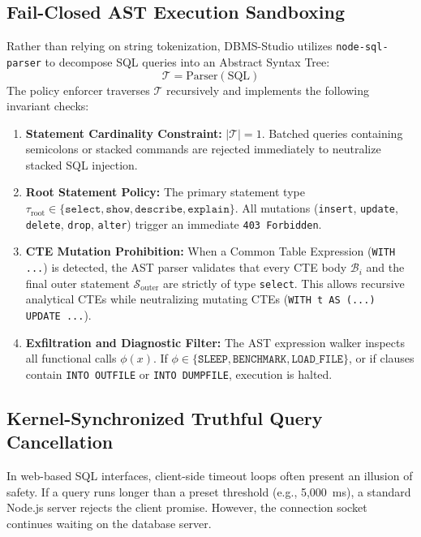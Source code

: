 \documentclass[conference]{IEEEtran}
\begin{document}
\subsection{Fail-Closed AST Execution Sandboxing}
Rather than relying on string tokenization, DBMS-Studio utilizes \texttt{node-sql-parser} to decompose SQL queries into an Abstract Syntax Tree:
\begin{equation}
    \mathcal{T} = \text{Parser}(\text{SQL})
\end{equation}
The policy enforcer traverses $\mathcal{T}$ recursively and implements the following invariant checks:
\begin{enumerate}
    \item \textbf{Statement Cardinality Constraint:} $|\mathcal{T}| = 1$. Batched queries containing semicolons or stacked commands are rejected immediately to neutralize stacked SQL injection.
    \item \textbf{Root Statement Policy:} The primary statement type $\tau_{\text{root}} \in \{\texttt{select}, \texttt{show}, \texttt{describe}, \texttt{explain}\}$. All mutations (\texttt{insert}, \texttt{update}, \texttt{delete}, \texttt{drop}, \texttt{alter}) trigger an immediate \texttt{403 Forbidden}.
    \item \textbf{CTE Mutation Prohibition:} When a Common Table Expression (\texttt{WITH ...}) is detected, the AST parser validates that every CTE body $\mathcal{B}_i$ and the final outer statement $\mathcal{S}_{\text{outer}}$ are strictly of type \texttt{select}. This allows recursive analytical CTEs while neutralizing mutating CTEs (\texttt{WITH t AS (...) UPDATE ...}).
    \item \textbf{Exfiltration and Diagnostic Filter:} The AST expression walker inspects all functional calls $\phi(x)$. If $\phi \in \{\texttt{SLEEP}, \texttt{BENCHMARK}, \texttt{LOAD\_FILE}\}$, or if clauses contain \texttt{INTO OUTFILE} or \texttt{INTO DUMPFILE}, execution is halted.
\end{enumerate}

\subsection{Kernel-Synchronized Truthful Query Cancellation}
In web-based SQL interfaces, client-side timeout loops often present an illusion of safety. If a query runs longer than a preset threshold (e.g., 5,000~ms), a standard Node.js server rejects the client promise. However, the connection socket continues waiting on the database server.
\end{document}
